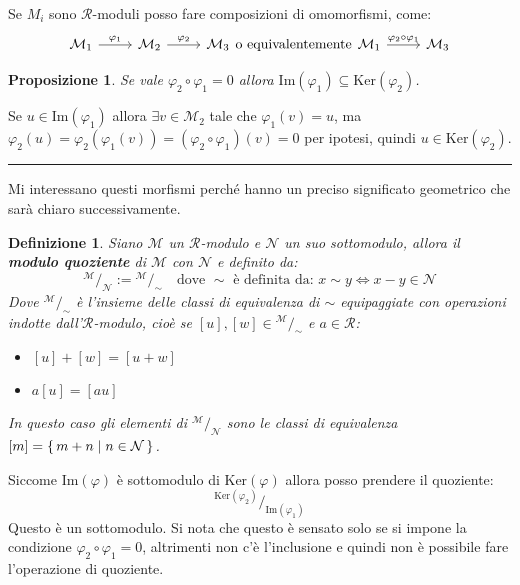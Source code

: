 \documentclass[10pt, twoside=false, x11names]{scrbook}
\newtheorem{proposition}[theorem]{Proposizione}
\newtheorem{definition}[theorem]{Definizione}
\newenvironment{proof}{{\textbf{Dimostrazione}:}}{\hfill\rule{2mm}{2mm} \newline}
\newcommand{\R}{\mathcal{R}}
\newcommand{\M}{\mathcal{M}}
\newcommand{\N}{\mathcal{N}}
\newcommand{\im}[1]{\mathrm{Im}( #1 )}
\renewcommand{\ker}[1]{\mathrm{Ker}( #1)}
\renewcommand{\phi}{\varphi}
\newcommand*\quot[2]{{^{\textstyle #1}\big/_{\textstyle #2}}}
\begin{document}
Se $ M_i $ sono $ \R $-moduli posso fare composizioni di omomorfismi, come:
\[
  \begin{tikzcd}
    \M_1 \arrow{r}{\phi_1} & \M_2 \arrow{r}{\phi_2} & \M_3
  \end{tikzcd}
  \text{o equivalentemente}
  \begin{tikzcd}
    \M_1 \arrow{r}{\phi_2 \circ \phi_1} & \M_3
  \end{tikzcd}
\]
\begin{proposition}
Se vale $ \phi_2 \circ \phi_1 = 0 $ allora $ \im{\phi_1} \subseteq \ker{\phi_2} $.
\end{proposition}
\begin{proof}
  Se $ u \in \im {\phi_1} $ allora $ \exists v \in \M_2 $ tale che $ \phi_1(v) = u $,
  ma $ \phi_2(u) = \phi_2(\phi_1(v)) = (\phi_2 \circ \phi_1)(v) = 0 $ per ipotesi, quindi $ u \in \ker{\phi_2} $.
\end{proof}

Mi interessano questi morfismi perché hanno un preciso significato geometrico che
sarà chiaro successivamente.

\begin{definition}
  Siano $ \M $ un $ \R $-modulo e $ \N $ un suo sottomodulo, allora il \textbf{modulo
  quoziente}  di $ \M $ con $ \N $ e definito da:
  \[
    \quot{\M}{\N} := \quot{\M}{\sim} \quad \text{dove } \sim \text{ è definita da: } x \sim y \Leftrightarrow x - y \in \N
  \]
  Dove $ \quot{\M}{\sim} $ è l'insieme delle classi di equivalenza di $ \sim $ equipaggiate
  con operazioni indotte dall'$ \R $-modulo, cioè se $ [u], [w] \in \quot{\M}{\sim} $ e $ a \in \R $:
  \begin{itemize}
  \item $ [u] + [w] = [u + w] $
  \item $ a [u] = [au] $
  \end{itemize}
  In questo caso gli elementi di $ \quot{\M}{\N} $ sono le classi di equivalenza
  $ [m] = \set{ m + n | n \in \N } $.
\end{definition}

Siccome $ \im{\phi} $ è sottomodulo di $ \ker{\phi} $ allora posso prendere
il quoziente:
\[
  \quot{\ker{\phi_2}}{\im{\phi_1}}
\]
Questo è un sottomodulo. Si nota che questo è sensato solo se si impone la condizione
$ \phi_2 \circ \phi_1 = 0 $, altrimenti non c'è l'inclusione e quindi non è possibile fare l'operazione
di quoziente.
\end{document}
